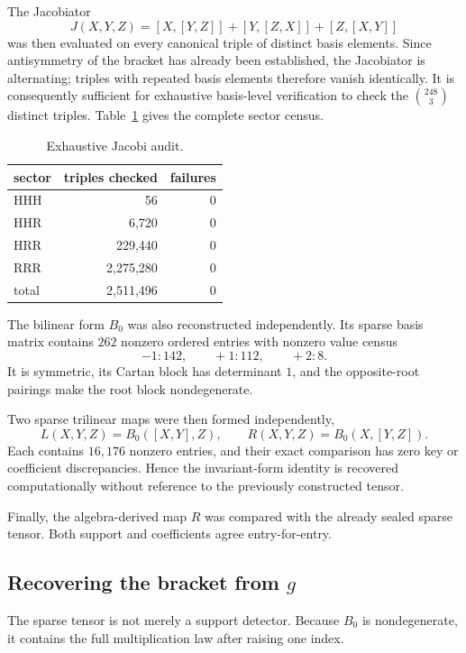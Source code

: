 \documentclass[11pt]{article}
\theoremstyle{definition}
\theoremstyle{remark}
\begin{document}
The Jacobiator
\[
J(X,Y,Z)=[X,[Y,Z]]+[Y,[Z,X]]+[Z,[X,Y]]
\]
was then evaluated on every canonical triple of distinct basis elements.  Since antisymmetry of the bracket has already been established, the Jacobiator is alternating; triples with repeated basis elements therefore vanish identically.  It is consequently sufficient for exhaustive basis-level verification to check the $\binom{248}{3}$ distinct triples.  Table~\ref{tab:jacobi} gives the complete sector census.

\begin{table}[ht]
\centering
\caption{Exhaustive Jacobi audit.}
\label{tab:jacobi}
\begin{tabular}{lrr}
\toprule
sector & triples checked & failures\\
\midrule
HHH & 56 & 0\\
HHR & 6,720 & 0\\
HRR & 229,440 & 0\\
RRR & 2,275,280 & 0\\
\midrule
total & 2,511,496 & 0\\
\bottomrule
\end{tabular}
\end{table}

The bilinear form $B_0$ was also reconstructed independently.  Its sparse basis matrix contains $262$ nonzero ordered entries with nonzero value census
\[
-1:142,\qquad +1:112,\qquad +2:8.
\]
It is symmetric, its Cartan block has determinant $1$, and the opposite-root pairings make the root block nondegenerate.

Two sparse trilinear maps were then formed independently,
\[
L(X,Y,Z)=B_0([X,Y],Z),
\qquad
R(X,Y,Z)=B_0(X,[Y,Z]).
\]
Each contains $16{,}176$ nonzero entries, and their exact comparison has zero key or coefficient discrepancies.  Hence the invariant-form identity is recovered computationally without reference to the previously constructed tensor.

Finally, the algebra-derived map $R$ was compared with the already sealed sparse tensor.  Both support and coefficients agree entry-for-entry.

\subsection{Recovering the bracket from \texorpdfstring{$g$}{g}}

The sparse tensor is not merely a support detector.  Because $B_0$ is nondegenerate, it contains the full multiplication law after raising one index.
\end{document}
